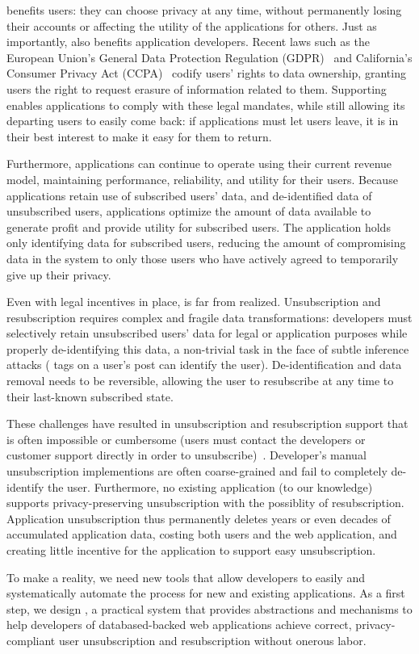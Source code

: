 \name benefits users: they can choose privacy at any time, without
permanently losing their accounts or affecting the utility of the applications for others.  Just as
importantly, \name also benefits application developers. Recent laws such as the
European Union's General Data Protection Regulation (GDPR)~\cite{eu:gdpr} and California's Consumer
Privacy Act (CCPA)~\cite{ca:privacy-act} codify users' rights to data ownership, granting users the
right to request erasure of information related to them. Supporting \name enables
applications to comply with these legal mandates, while still allowing its departing users to easily
come back: if applications must let users leave, it is in their best interest to make it easy for
them to return.  

Furthermore, applications can continue to operate using their current revenue model, maintaining
performance, reliability, and utility for their users.  Because applications retain use of
subscribed users' data, and de-identified data of unsubscribed users, applications optimize the
amount of data available to generate profit and provide utility for subscribed users. The
application holds only identifying data for subscribed users, reducing the amount of
compromising data in the system to only those users who have actively agreed to temporarily give up
their privacy.

Even with legal incentives in place, \name is far from realized.
Unsubscription and resubscription requires complex and fragile data transformations: 
developers must selectively retain unsubscribed users' data for legal or application purposes while
properly de-identifying this data, a non-trivial task in the face of subtle inference attacks (\eg
tags on a user's post can identify the user). De-identification and data removal needs to be
reversible, allowing the user to resubscribe at any time to their last-known subscribed state.

These challenges have resulted in unsubscription and resubscription support that is often impossible
or cumbersome (users must contact the developers or customer support directly in order to
unsubscribe)~\cite{jdm}.  Developer's manual unsubscription implementions are often coarse-grained
and fail to completely de-identify the user. Furthermore, no existing application (to our knowledge)
supports privacy-preserving unsubscription with the possiblity of resubscription. Application
unsubscription thus permanently deletes years or even decades of accumulated application data,
costing both users and the web application, and creating little incentive for the application to
support easy unsubscription. 

To make \name a reality, we need new tools that allow developers to easily and
systematically automate the process for new and existing applications. As a first step, we design 
\sys, a practical system that provides abstractions and mechanisms to help developers of databased-backed web
applications achieve correct, privacy-compliant user unsubscription and resubscription without
onerous labor.
